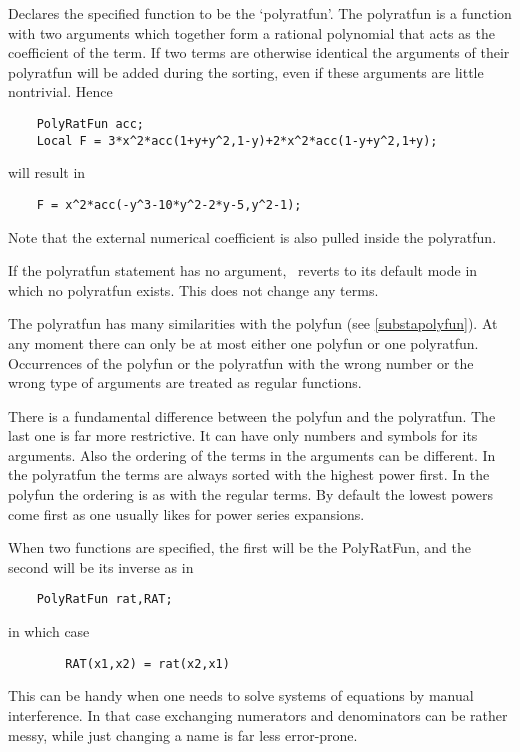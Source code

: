 \noindent Declares the specified function to be the 
`polyratfun'. The polyratfun is a function with two 
arguments which together form a rational polynomial that 
acts as the 
coefficient of the term. If two terms are otherwise 
identical the arguments of their polyratfun will be added during the sorting, 
even if these arguments are little nontrivial. Hence
\begin{verbatim}
    PolyRatFun acc;
    Local F = 3*x^2*acc(1+y+y^2,1-y)+2*x^2*acc(1-y+y^2,1+y);
\end{verbatim}
will result in
\begin{verbatim}
    F = x^2*acc(-y^3-10*y^2-2*y-5,y^2-1);
\end{verbatim}
Note that the external numerical coefficient is also 
pulled inside the polyratfun.

\noindent If the polyratfun statement has no argument, \FORM\ reverts to its 
default mode in which no polyratfun exists. This does not change any terms.

\noindent The polyratfun has many similarities with the polyfun (see 
\ref{substapolyfun}). At any moment there can only be at most either one 
polyfun or one polyratfun. Occurrences of the polyfun or the polyratfun 
with the wrong number or the wrong type of arguments are treated as regular 
functions.

\noindent There is a fundamental difference between the polyfun and the 
polyratfun. The last one is far more restrictive. It can have only numbers 
and symbols for its arguments. Also the ordering of the terms in the 
arguments can be different. In the polyratfun the terms are always sorted 
with the highest power first. In the polyfun the ordering is as with the 
regular terms. By default the lowest powers come first as one usually likes 
for power series expansions.

\noindent When two functions are specified, the first will be the 
PolyRatFun, and the second will be its inverse as in
\begin{verbatim}
    PolyRatFun rat,RAT;
\end{verbatim}
in which case
\begin{verbatim}
        RAT(x1,x2) = rat(x2,x1)
\end{verbatim}
This can be handy when one needs to solve systems of equations by manual 
interference. In that case exchanging numerators and denominators can be 
rather messy, while just changing a name is far less error-prone.

